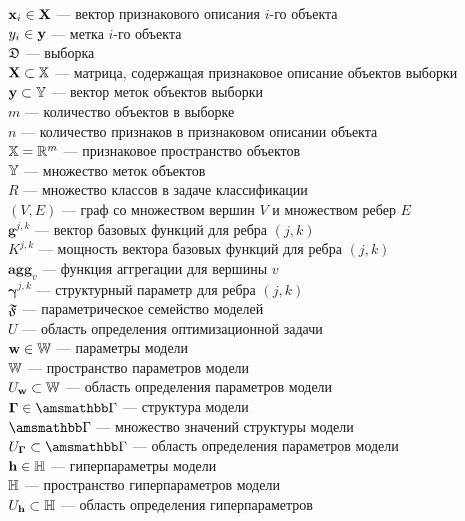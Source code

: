 \noindent$\mathbf{x}_i \in \mathbf{X}$ --- вектор признакового описания $i$-го объекта\\
$y_i \in \mathbf{y}$ --- метка $i$-го объекта\\
$\mathfrak{D}$ --- выборка\\
$\mathbf{X} \subset \mathbb{X}$ --- матрица, содержащая признаковое описание объектов выборки\\
$\mathbf{y} \subset \mathbb{Y}$ --- вектор меток объектов выборки\\
$m$ --- количество объектов в выборке\\
$n$ --- количество признаков в признаковом описании объекта\\
$\mathbb{X} = \mathbb{R}^m$ --- признаковое пространство объектов\\
$\mathbb{Y}$ --- множество меток объектов\\
$R$ --- множество классов в задаче классификации\\
$(V,E)$ --- граф со множеством вершин $V$ и множеством ребер $E$\\
$\mathbf{g}^{j,k}$ --- вектор базовых функций для ребра $(j,k)$\\
$K^{j,k}$ --- мощность вектора базовых функций для ребра $(j,k)$\\
$\textbf{agg}_v$ --- функция аггрегации для вершины $v$ \\
$\boldsymbol{\gamma}^{j,k}$ --- структурный параметр для ребра $(j,k)$\\
$\mathfrak{F}$ --- параметрическое семейство моделей\\
$U$ --- область определения оптимизационной задачи\\
$\mathbf{w} \in \mathbb{W}$ --- параметры модели\\
$\mathbb{W}$ --- пространство параметров модели\\
$U_\mathbf{w} \subset \mathbb{W}$ --- область определения параметров модели\\
$\G \in \Gb$ --- структура модели\\
$\Gb$ --- множество значений структуры модели\\
$\UG \subset \Gb$ --- область определения параметров модели\\
$\mathbf{h} \in \mathbb{H}$ --- гиперпараметры модели\\
$\mathbb{H}$ --- пространство гиперпараметров модели\\
$U_{\mathbf{h}} \subset \mathbb{H}$ --- область определения гиперпараметров\\
